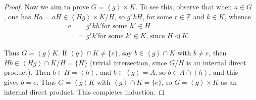 \begin{proof}
	Now we aim to prove $G = \left\langle g \right\rangle  \times K$. To see this, observe that when $a \in G$, one has $Ha = aH \in \left\langle H g \right\rangle \times K / H$, so $g^r k H$, for some $r \in \mathbb{Z}$ and $k \in K$, whence 
	\begin{align*}
		a &= g^r k h' \text{for some  $h' \in H$}\\
		&=  g^r k' \text{for some  $k' \in K$, since $H \triangleleft K$}
	.\end{align*}

	Thus $G = \left\langle g \right\rangle K $. If $ \left\langle g \right\rangle \cap K \neq \{e\}  $, say $b \in \left\langle g \right\rangle \cap K $ with $b \neq e$, then $H b \in \left\langle Hg \right\rangle \cap K / H = \{H\} $ (trivial intersection, since $G / H$ is an internal direct product). Then $b \in H = \left\langle h \right\rangle $, and $b \in \left\langle g \right\rangle = A $, so $b \in A \cap \left\langle h \right\rangle $, and this gives $b = e$. Thus $G = \left\langle g \right\rangle  K$ with $\left\langle g \right\rangle  \cap K = \{e\} $, so $G  = \left\langle g \right\rangle \times K$ as an internal direct product. This completes induction.
\end{proof}

